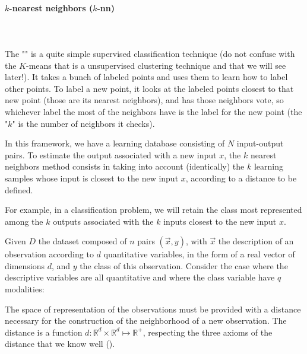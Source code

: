 	
	
	\paragraph{$k$-nearest neighbors ($k$-nn)}\mbox{}\\\\
	The "" is a quite simple supervised classification technique (do not confuse with the $K$-means that is a unsupervised clustering technique and that we will see later!). It takes a bunch of labeled points and uses them to learn how to label other points.  To label a new point, it looks at the labeled points closest to that new point (those are its nearest neighbors), and has those neighbors vote, so whichever label the most of the neighbors have is the label for the new point (the "$k$" is the number of neighbors it checks).
	
	In this framework, we have a learning database consisting of $N$ input-output pairs. To estimate the output associated with a new input $x$, the $k$ nearest neighbors method consists in taking into account (identically) the $k$ learning samples whose input is closest to the new input $x$, according to a distance to be defined.

For example, in a classification problem, we will retain the class most represented among the $k$ outputs associated with the $k$ inputs closest to the new input $x$.

	Given $D$ the dataset composed of $n$ pairs $(\vec{x}, y)$, with $\vec{x}$ the description of an observation according to $d$ quantitative variables, in the form of a real vector of dimensions $d$, and $y$ the class of this observation. Consider the case where the descriptive variables are all quantitative and where the class variable have $q$ modalities:
	
	The space of representation of the observations must be provided with a distance necessary for the construction of the neighborhood of a new observation. The distance is a function $d:\mathbb{R}^d\times\mathbb{R}^d\mapsto\mathbb{R}^+$, respecting the three axioms of the distance that we know well ().
	

